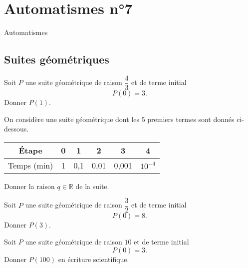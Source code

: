 \documentclass[14pt]{beamer}
\newcommand{\R}{\mathbb{R}}
\begin{document}
\section{Automatismes n°7}

\begin{frame}

\centering \huge
Automatismes

\end{frame}

\subsection{Suites géométriques}

\begin{frame}{1}
    Soit $P$ une suite géométrique de raison $\dfrac43$ et de terme initial
        \[ P(0) = 3. \]
    Donner $P(1)$.
\end{frame}

\begin{frame}{2}
    On considère une suite géométrique dont les $5$ premiers termes sont donnés ci-dessous.
    \begin{center}
    \begin{tabular}{|c|c|c|c|c|c|}\hline
        Étape & 0 & 1 & 2 & 3 & 4 \\ \hline
        Temps (min) & 1 & 0,1 & 0,01 & 0,001 & $10^{-4}$ \\ \hline
    \end{tabular}
    \end{center}
    Donner la raison $q\in\R$ de la suite.
\end{frame}

\begin{frame}{3}
    Soit $P$ une suite géométrique de raison $\dfrac32$ et de terme initial
        \[ P(0) = 8. \]
    Donner $P(3)$.
\end{frame}

\begin{frame}{4}
    Soit $P$ une suite géométrique de raison $10$ et de terme initial
        \[ P(0) = 3. \]
    Donner $P(100)$ en écriture scientifique.
\end{frame}
\end{document}
